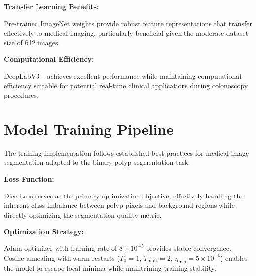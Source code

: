 \documentclass[a4paper,12pt]{report}
\begin{document}
\vspace{1em} %

\noindent\textbf{\normalsize Transfer Learning Benefits:}
\vspace{0.5em}

Pre-trained ImageNet weights provide robust feature representations that transfer effectively to medical imaging, particularly beneficial given the moderate dataset size of 612 images.

\vspace{1em} %

\noindent\textbf{\normalsize Computational Efficiency:}
\vspace{0.5em}

DeepLabV3+ achieves excellent performance while maintaining computational efficiency suitable for potential real-time clinical applications during colonoscopy procedures.



    \section{Model Training Pipeline}

The training implementation follows established best practices for medical image segmentation adapted to the binary polyp segmentation task:

\vspace{1em}

\noindent\textbf{\normalsize Loss Function:}
\vspace{0.5em}

Dice Loss serves as the primary optimization objective, effectively handling the inherent class imbalance between polyp pixels and background regions while directly optimizing the segmentation quality metric.

\vspace{1em}

\noindent\textbf{\normalsize Optimization Strategy:}
\vspace{0.5em}

Adam optimizer with learning rate of \(8 \times 10^{-5}\) provides stable convergence. Cosine annealing with warm restarts (\(T_0=1\), \(T_\text{mult}=2\), \(\eta_\text{min}=5 \times 10^{-5}\)) enables the model to escape local minima while maintaining training stability.

\vspace{1em}
\end{document}
